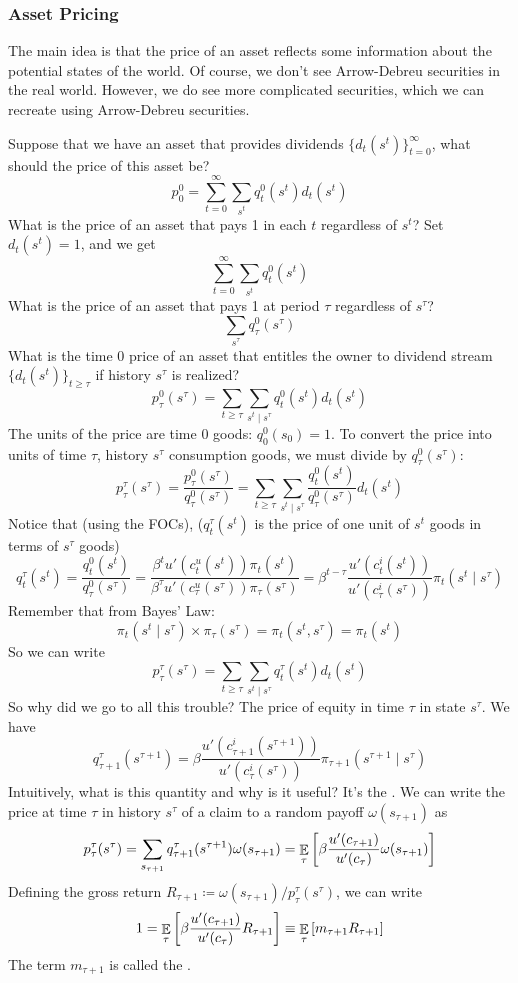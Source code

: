 \documentclass[10pt]{article}
\begin{document}
\subsubsection{Asset Pricing}

The main idea is that the price of an asset reflects some information about the potential states of the world. Of course, we don't see Arrow-Debreu securities in the real world. However, we do see more complicated securities, which we can recreate using Arrow-Debreu securities.

\begin{definition}
	Suppose that we have an asset that provides dividends $\{d_t(s^t)\}_{t=0}^\infty$, what should the price of this asset be?
	\[
	p_0^0 = \sum_{t=0}^\infty \sum_{s^t} q_t^0(s^t) d_t(s^t)
	\]
	What is the price of an asset that pays 1 in each $t$ regardless of $s^t$? Set $d_t(s^t) = 1$, and we get
	\[
	\sum_{t=0}^\infty \sum_{s^t} q_t^0(s^t)
	\]
	What is the price of an asset that pays 1 at period $\tau$ regardless of $s^\tau$?
	\[
	\sum_{s^\tau} q_\tau^0(s^\tau)
	\]
	What is the time 0 price of an asset that entitles the owner to dividend stream $\{d_t(s^t)\}_{t \ge \tau}$ if history $s^\tau$ is realized?
	\[
	p_\tau^0(s^\tau) = \sum_{t \ge \tau} \sum_{s^t \mid s^\tau} q_t^0(s^t) d_t(s^t)
	\]
	The units of the price are time 0 goods: $q_0^0(s_0) = 1$. To convert the price into units of time $\tau$, history $s^\tau$ consumption goods, we must divide by $q_\tau^0(s^\tau)$:
	\[
	p_\tau^\tau(s^\tau) = \frac{p_\tau^0(s^\tau)}{q_\tau^0(s^\tau)} = \sum_{t \ge \tau} \sum_{s^t \mid s^\tau} \frac{q_t^0(s^t)}{q_\tau^0(s^\tau)} d_t(s^t)
	\]
	Notice that (using the FOCs), ($q_t^\tau(s^t)$ is the price of one unit of $s^t$ goods in terms of $s^\tau$ goods)
	\[
	q_t^\tau(s^t) = \frac{q_t^0(s^t)}{q_\tau^0(s^\tau)} = \frac{\beta^t u'(c_t^u(s^t))\pi_t(s^t)}{\beta^\tau u'(c_\tau^u(s^\tau))\pi_\tau(s^\tau)} = \beta^{t-\tau} \frac{u'(c_t^i(s^t))}{u'(c_\tau^i(s^\tau))} \pi_t(s^t \mid s^\tau)
	\]
	Remember that from Bayes' Law:
	\[
	\pi_t(s^t \mid s^\tau) \times \pi_\tau(s^\tau) = \pi_t(s^t,s^\tau) = \pi_t(s^t)
	\]
	So we can write
	\[
	p_\tau^\tau(s^\tau) = \sum_{t \ge \tau} \sum_{s^t \mid s^\tau} q_t^\tau (s^t) d_t(s^t)
	\]
	So why did we go to all this trouble? The price of equity in time $\tau$ in state $s^\tau$. We have
	\[
	q^\tau_{\tau+1}(s^{\tau+1}) = \beta \frac{u'(c^i_{\tau+1}(s^{\tau+1}))}{u'(c^i_{\tau}(s^{\tau}))} \pi_{\tau+1}(s^{\tau+1} \mid s^\tau)
	\]
	Intuitively, what is this quantity and why is it useful? It's the . We can write the price at time $\tau$ in history $s^\tau$ of a claim to a random payoff $\omega(s_{\tau+1})$ as
	\[
	p_\tau^\tau(s^\tau) = \sum_{s_{\tau+1}} q^\tau_{\tau+1}(s^{\tau+1})\omega(s_{\tau+1}) = \mathop{\mathbb{E}}_\tau \left[\beta \frac{u'(c_{\tau+1})}{u'(c_\tau)} \omega(s_{\tau+1}) \right]
	\]
	Defining the gross return $R_{\tau+1} \coloneqq \omega(s_{\tau+1}) / p_\tau^\tau(s^\tau)$, we can write
	\[
	1 = \mathop{\mathbb{E}}_\tau\left[\beta \frac{u'(c_{\tau+1})}{u'(c_\tau)} R_{\tau+1} \right] \equiv \mathop{\mathbb{E}}_\tau \left[m_{\tau+1}R_{\tau+1} \right]
	\]
	The term $m_{\tau+1}$ is called the .
\end{definition}
\end{document}
